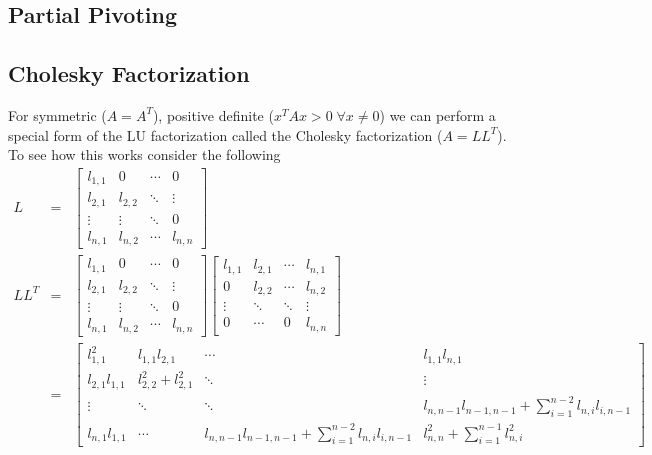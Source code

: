 
\subsection{Partial Pivoting}


\subsection{Cholesky Factorization}

For symmetric ($A=A^T$), positive definite ($x^TAx>0\;\forall x\neq 0$) we can perform a special form of the LU factorization called the Cholesky factorization ($A=LL^T$).  To see how this works consider the following
\begin{eqnarray*}
L &=& \left[\begin{matrix}
l_{1,1} & 0       & \cdots & 0 \\
l_{2,1} & l_{2,2} & \ddots & \vdots \\
\vdots  & \vdots  & \ddots & 0 \\
l_{n,1} & l_{n,2} & \cdots & l_{n,n}
\end{matrix}\right] \\
LL^T &=&\left[\begin{matrix}
l_{1,1} & 0       & \cdots & 0 \\
l_{2,1} & l_{2,2} & \ddots & \vdots \\
\vdots  & \vdots  & \ddots & 0 \\
l_{n,1} & l_{n,2} & \cdots & l_{n,n}
\end{matrix}\right]\left[\begin{matrix}
l_{1,1} & l_{2,1} & \cdots & l_{n,1} \\
0       & l_{2,2} & \cdots & l_{n,2} \\
\vdots  & \ddots  & \ddots & \vdots \\
0       & \cdots  & 0      & l_{n,n}
\end{matrix}\right] \\
&=& \left[\begin{matrix}
l_{1,1}^2      & l_{1,1}l_{2,1}      & \cdots & l_{1,1}l_{n,1} \\
l_{2,1}l_{1,1} & l_{2,2}^2+l_{2,1}^2 & \ddots & \vdots \\
\vdots         & \ddots              & \ddots & l_{n,n-1}l_{n-1,n-1}+\sum_{i=1}^{n-2}l_{n,i}l_{i,n-1} \\
l_{n,1}l_{1,1} & \cdots              & l_{n,n-1}l_{n-1,n-1}+\sum_{i=1}^{n-2}l_{n,i}l_{i,n-1} & l_{n,n}^2+\sum_{i=1}^{n-1}l_{n,i}^2
\end{matrix}\right]
\end{eqnarray*}


